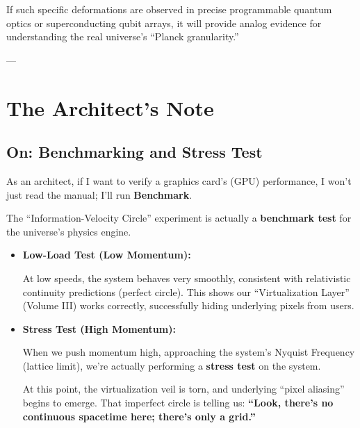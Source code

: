 If such specific deformations are observed in precise programmable quantum optics or superconducting qubit arrays, it will provide analog evidence for understanding the real universe's ``Planck granularity.''

---

\section{The Architect's Note}

\subsection{On: Benchmarking and Stress Test}

As an architect, if I want to verify a graphics card's (GPU) performance, I won't just read the manual; I'll run \textbf{Benchmark}.

The ``Information-Velocity Circle'' experiment is actually a \textbf{benchmark test} for the universe's physics engine.

\begin{itemize}
\item \textbf{Low-Load Test (Low Momentum):}

  At low speeds, the system behaves very smoothly, consistent with relativistic continuity predictions (perfect circle). This shows our ``Virtualization Layer'' (Volume III) works correctly, successfully hiding underlying pixels from users.

\item \textbf{Stress Test (High Momentum):}

  When we push momentum high, approaching the system's Nyquist Frequency (lattice limit), we're actually performing a \textbf{stress test} on the system.

  At this point, the virtualization veil is torn, and underlying ``pixel aliasing'' begins to emerge. That imperfect circle is telling us: \textbf{``Look, there's no continuous spacetime here; there's only a grid.''}
\end{itemize}

